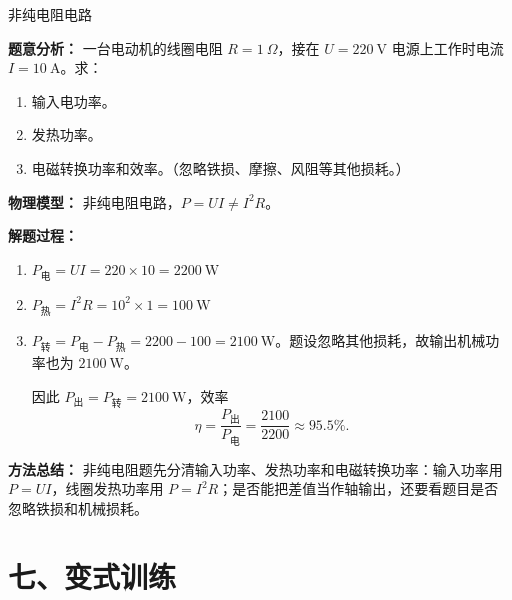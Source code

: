 \begin{examplebox}{非纯电阻电路}

\textbf{题意分析：} 一台电动机的线圈电阻 $R = 1\ \Omega$，接在 $U = 220\ \mathrm{V}$ 电源上工作时电流 $I = 10\ \mathrm{A}$。求：
\begin{enumerate}
  \item 输入电功率。
  \item 发热功率。
  \item 电磁转换功率和效率。（忽略铁损、摩擦、风阻等其他损耗。）
\end{enumerate}

\textbf{物理模型：} 非纯电阻电路，$P = UI \neq I^2R$。

\begin{center}


\label{fig:non-ohmic-motor-example}
\end{center}

\textbf{解题过程：}

\begin{enumerate}
  \item $P_{\text{电}} = UI = 220 \times 10 = 2200\ \mathrm{W}$

  \item $P_{\text{热}} = I^2 R = 10^2 \times 1 = 100\ \mathrm{W}$

  \item $P_{\text{转}} = P_{\text{电}} - P_{\text{热}} = 2200 - 100 = 2100\ \mathrm{W}$。题设忽略其他损耗，故输出机械功率也为 $2100\ \mathrm{W}$。

  因此 $P_{\text{出}}=P_{\text{转}}=2100\ \mathrm{W}$，效率
  \[
  \eta = \frac{P_{\text{出}}}{P_{\text{电}}} = \frac{2100}{2200} \approx 95.5\%.
  \]
\end{enumerate}

\textbf{方法总结：} 非纯电阻题先分清输入功率、发热功率和电磁转换功率：输入功率用 $P = UI$，线圈发热功率用 $P = I^2R$；是否能把差值当作轴输出，还要看题目是否忽略铁损和机械损耗。

\end{examplebox}

\section*{七、变式训练}

